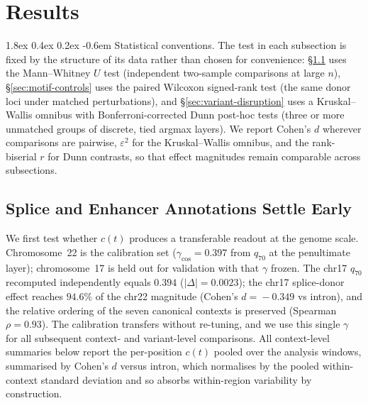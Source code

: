 \documentclass{article}
\makeatletter
\renewcommand\paragraph{\@startsection{paragraph}{4}{\z@}%
  {1.8ex \@plus 0.4ex \@minus 0.2ex}%
  {-0.6em}%
{\normalfont\normalsize\bfseries}}
\theoremstyle{plain}
\theoremstyle{definition}
\theoremstyle{remark}
\makeatother
\begin{document}
\section{Results}
\label{sec:utility}

\paragraph{Statistical conventions.} The test in each subsection is fixed by the structure of its data rather than chosen for convenience: \S\ref{sec:shallowness} uses the Mann--Whitney $U$ test (independent two-sample comparisons at large $n$), \S\ref{sec:motif-controls} uses the paired Wilcoxon signed-rank test (the same donor loci under matched perturbations), and \S\ref{sec:variant-disruption} uses a Kruskal--Wallis omnibus with Bonferroni-corrected Dunn post-hoc tests (three or more unmatched groups of discrete, tied argmax layers). We report Cohen's $d$ wherever comparisons are pairwise, $\varepsilon^2$ for the Kruskal--Wallis omnibus, and the rank-biserial $r$ for Dunn contrasts, so that effect magnitudes remain comparable across subsections.

\subsection{Splice and Enhancer Annotations Settle Early}
\label{sec:shallowness}

We first test whether $c(t)$ produces a transferable readout at the genome scale. Chromosome~22 is the calibration set ($\gamma_{\cos}\!=\!0.397$ from $q_{70}$ at the penultimate layer); chromosome~17 is held out for validation with that $\gamma$ frozen. The chr17 $q_{70}$ recomputed independently equals $0.394$ ($|\Delta|\!=\!0.0023$); the chr17 splice-donor effect reaches $94.6\%$ of the chr22 magnitude (Cohen's $d\!=\!-0.349$ vs intron), and the relative ordering of the seven canonical contexts is preserved (Spearman $\rho\!=\!0.93$). The calibration transfers without re-tuning, and we use this single $\gamma$ for all subsequent context- and variant-level comparisons. All context-level summaries below report the per-position $c(t)$ pooled over the analysis windows, summarised by Cohen's $d$ versus intron, which normalises by the pooled within-context standard deviation and so absorbs within-region variability by construction.
\end{document}
